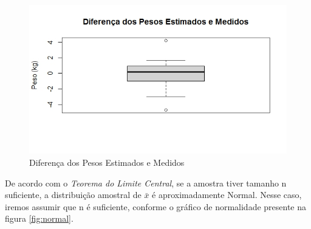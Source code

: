 \documentclass[12pt, a4paper]{article}
\begin{document}
\begin{figure}[h]
\centering
\includegraphics[scale=0.6]{img/box_diff.jpeg}
\caption{Diferença dos Pesos Estimados e Medidos}
\label{fig:blocos_diff}
\end{figure}
\par De acordo com o \textit{Teorema do Limite Central}, se a amostra tiver tamanho n suficiente, a distribuição amostral de $\bar{x}$ é aproximadamente Normal. Nesse caso, iremos assumir que n é suficiente, conforme o gráfico de normalidade presente na figura \ref{fig:normal}.
\end{document}
